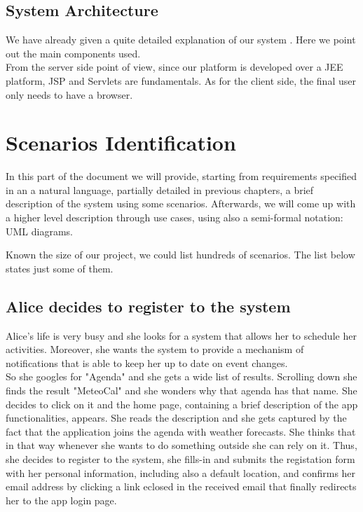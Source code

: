 \documentclass[12pt]{book}
\begin{document}
\section{System Architecture}
We have already given a quite detailed explanation of our system . Here we point out the main components used.\\ 
From the server side point of view, since our platform is developed over a JEE platform, JSP and Servlets are fundamentals.
As for the client side, the final user only needs to have a browser.\\

\chapter{Scenarios Identification}

In this part of the document we will provide, starting from requirements specified in an a natural language, partially detailed in previous chapters, a brief description of the system using some scenarios. Afterwards, we will come up with a higher level description through use cases, using also a semi-formal notation: UML diagrams.\\ \medskip

Known the size of our project, we could list hundreds of scenarios. The list below states just some of them.

\section{Alice decides to register to the system}
Alice's life is very busy and she looks for a system that allows her to schedule her activities. Moreover, she wants the system to provide a mechanism of notifications that is able to keep her up to date on event changes. \\
So she googles for "Agenda" and she gets a wide list of results. Scrolling down she finds the result  "MeteoCal" and she wonders why that agenda has that name. She decides to click on it and the home page, containing a brief description of the app functionalities,  appears. She reads the description and she gets captured by the fact that the application joins the agenda with weather forecasts. She thinks that in that way whenever she wants to do something outside she can rely on it. Thus, she decides to register to the system, she fills-in and submits the registation form with her personal information, including also a default location, and confirms her email address by clicking a link eclosed in the received email that finally redirects her to the app login page. \\ 
\end{document}
